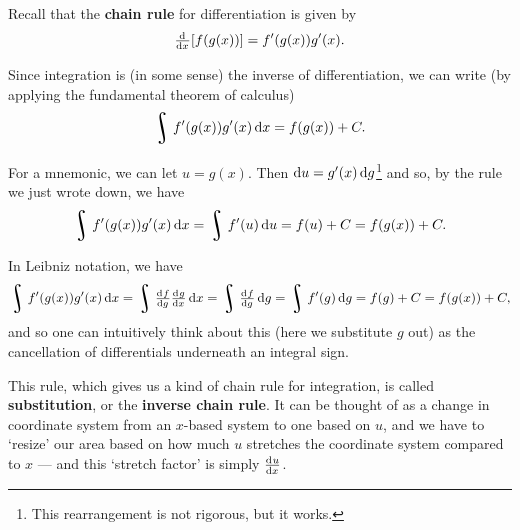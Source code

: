


Recall that the \textbf{chain rule} for differentiation is given by
\begin{displaymath}
  \od{}{x} [f(g(x))] = f'(g(x)) g'(x).
\end{displaymath}

Since integration is (in some sense) the inverse of differentiation, we can write (by applying the fundamental theorem of calculus)
\begin{displaymath}
  \rint f'(g(x)) g'(x) \dif{x} = f(g(x)) + C.
\end{displaymath}

For a mnemonic, we can let $ u = g(x) $. Then $ \dif{u} = g'(x) \dif{g} $\footnote{This rearrangement is not rigorous, but it works.}
and so, by the rule we just wrote down, we have
\begin{displaymath}
  \rint f'(g(x)) g'(x) \dif{x} = \rint f'(u) \dif{u} = f(u) + C = f(g(x)) + C.
\end{displaymath}

In Leibniz notation, we have
\begin{displaymath}
  \rint f'(g(x)) g'(x) \dif{x} = \rint \od{f}{g} \od{g}{x} \dif{x} = \rint \od{f}{g} \dif{g} = \rint f'(g) \dif{g} = f(g) + C = f(g(x)) + C,
\end{displaymath}
and so one can intuitively think about this (here we substitute $ g $ out) as the cancellation of differentials underneath an integral sign.

This rule, which gives us a kind of chain rule for integration, is called \textbf{substitution}, or the \textbf{inverse chain rule}. It
can be thought of as a change in coordinate system from an $ x$-based system to one based on $ u $, and we have to `resize' our area based
on how much $ u $ stretches the coordinate system compared to $ x $ --- and this `stretch factor' is simply $ \od{u}{x} $.

